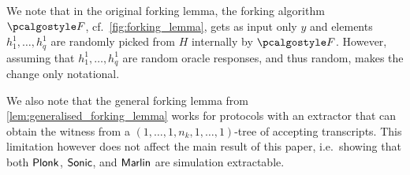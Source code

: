 We note that in the original forking lemma, the forking algorithm $\forking$,
cf.~\cref{fig:forking_lemma}, gets as input only $y$ and elements $h^1_1, \ldots,
h^1_q$ are randomly picked from $H$ internally by $\forking$. However, assuming
that $h^1_1, \ldots, h^1_q$ are random oracle responses, and thus random, makes
the change only notational.

We also note that the general forking lemma from
\cref{lem:generalised_forking_lemma} works for protocols with an extractor that can obtain the
witness from a $(1, \ldots, 1, n_k, 1, \ldots, 1)$-tree of accepting
transcripts. This limitation however does not affect the main result of this
paper, i.e.~showing that both $\textnormal{\textsf{Plonk}}$, ${\textnormal{\textsf{Sonic}}}$, and ${\textnormal{\textsf{Marlin}}}$ are simulation extractable.

%
%
%
%
